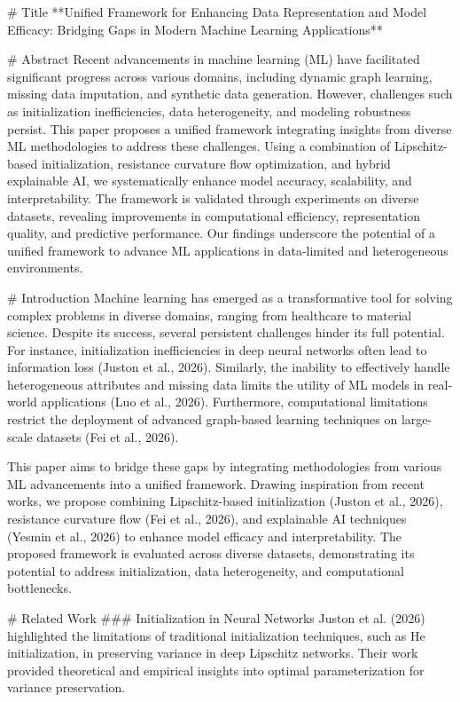 # Title
**Unified Framework for Enhancing Data Representation and Model Efficacy: Bridging Gaps in Modern Machine Learning Applications**

# Abstract
Recent advancements in machine learning (ML) have facilitated significant progress across various domains, including dynamic graph learning, missing data imputation, and synthetic data generation. However, challenges such as initialization inefficiencies, data heterogeneity, and modeling robustness persist. This paper proposes a unified framework integrating insights from diverse ML methodologies to address these challenges. Using a combination of Lipschitz-based initialization, resistance curvature flow optimization, and hybrid explainable AI, we systematically enhance model accuracy, scalability, and interpretability. The framework is validated through experiments on diverse datasets, revealing improvements in computational efficiency, representation quality, and predictive performance. Our findings underscore the potential of a unified framework to advance ML applications in data-limited and heterogeneous environments.

# Introduction
Machine learning has emerged as a transformative tool for solving complex problems in diverse domains, ranging from healthcare to material science. Despite its success, several persistent challenges hinder its full potential. For instance, initialization inefficiencies in deep neural networks often lead to information loss (Juston et al., 2026). Similarly, the inability to effectively handle heterogeneous attributes and missing data limits the utility of ML models in real-world applications (Luo et al., 2026). Furthermore, computational limitations restrict the deployment of advanced graph-based learning techniques on large-scale datasets (Fei et al., 2026).

This paper aims to bridge these gaps by integrating methodologies from various ML advancements into a unified framework. Drawing inspiration from recent works, we propose combining Lipschitz-based initialization (Juston et al., 2026), resistance curvature flow (Fei et al., 2026), and explainable AI techniques (Yesmin et al., 2026) to enhance model efficacy and interpretability. The proposed framework is evaluated across diverse datasets, demonstrating its potential to address initialization, data heterogeneity, and computational bottlenecks.

# Related Work
### Initialization in Neural Networks
Juston et al. (2026) highlighted the limitations of traditional initialization techniques, such as He initialization, in preserving variance in deep Lipschitz networks. Their work provided theoretical and empirical insights into optimal parameterization for variance preservation.

